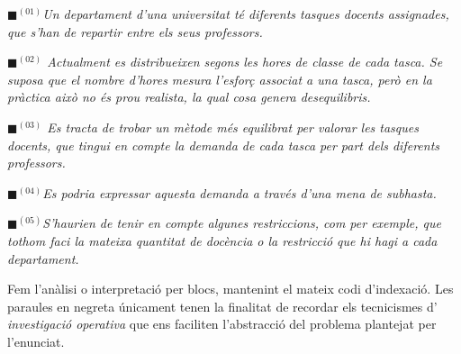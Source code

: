 \documentclass[10pt,twocolumn]{article}
\begin{document}
\begin{tcolorbox}[colback=black!1,title=\textbf{Enunciat del problema},coltitle=black,colbacktitle=black!10]

\textit{{\color{cyan!60}$\blacksquare$}$^{(01)}${\color{black!80}Un departament d'una universitat té diferents tasques docents assignades, que s'han de repartir entre els seus professors.}}
 
\textit{{\color{blue!60}$\blacksquare$}$^{(02)}$ Actualment es distribueixen segons les hores de classe de cada tasca. Se suposa que el nombre d'hores mesura l'esforç associat a una tasca, però en la pràctica això no és prou realista, la qual cosa genera desequilibris.}

\textit{{\color{green!60}$\blacksquare$}$^{(03)}$ {\color{black!80}Es tracta de trobar un mètode més equilibrat per valorar les tasques docents, que tingui en compte la demanda de cada tasca per part dels diferents professors.}}
 
\textit{{\color{purple!60}$\blacksquare$}$^{(04)}$Es podria expressar aquesta demanda a través d'una mena de subhasta.}
 
\textit{{\color{violet!60}$\blacksquare$}$^{(05)}${\color{black!80}S'haurien de tenir en compte algunes restriccions, com per exemple, que tothom faci la mateixa quantitat de docència o la restricció que hi hagi a cada departament.}}

\end{tcolorbox}
Fem  l'anàlisi o interpretació per blocs, mantenint el mateix codi d'indexació. Les paraules en negreta únicament tenen la finalitat de recordar els tecnicismes d' \textit{investigació operativa} que ens faciliten l'abstracció del problema plantejat per l'enunciat.
\end{document}
